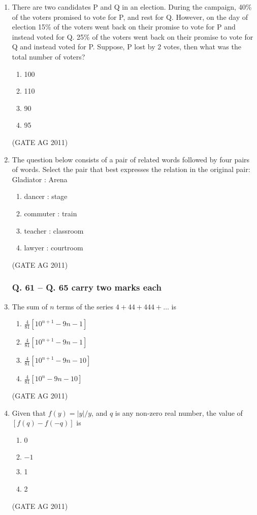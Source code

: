 \documentclass[journal,12pt,onecolumn]{IEEEtran}
\theoremstyle{remark}
\begin{document}
\begin{enumerate}
\item There are two candidates P and Q in an election. During the campaign, 40\% of the voters promised to vote for P, and rest for Q. However, on the day of election 15\% of the voters went back on their promise to vote for P and instead voted for Q. 25\% of the voters went back on their promise to vote for Q and instead voted for P. Suppose, P lost by 2 votes, then what was the total number of voters?
\begin{multicols}{4}
\begin{enumerate}
\item 100
\item 110
\item 90
\item 95
\end{enumerate}
\end{multicols}
\hfill{(GATE AG 2011)}

\item The question below consists of a pair of related words followed by four pairs of words. Select the pair that best expresses the relation in the original pair:  
Gladiator : Arena

\begin{enumerate}
\item dancer : stage
\item commuter : train
\item teacher : classroom
\item lawyer : courtroom
\end{enumerate}
\hfill{(GATE AG 2011)}


\subsubsection*{Q. 61 -- Q. 65 carry two marks each}


\item The sum of $n$ terms of the series $4 + 44 + 444 + \dots$ is  

\begin{enumerate}
\item $\frac{4}{81} \left[10^{n+1} - 9n - 1\right]$
\item $\frac{4}{81} \left[10^{n+1} - 9n - 1\right]$
\item $\frac{4}{81} \left[10^{n+1} - 9n - 10\right]$
\item $\frac{4}{81} \left[10^{n} - 9n - 10\right]$
\end{enumerate}
\hfill{(GATE AG 2011)}


\item Given that $f(y) = \left| y \right| / y$, and $q$ is any non-zero real number, the value of $\left[ f(q) - f(-q) \right]$ is  
\begin{multicols}{4}
\begin{enumerate}
\item 0
\item $-1$
\item 1
\item 2
\end{enumerate}
\end{multicols}
\hfill{(GATE AG 2011)}


\end{enumerate}
\end{document}
